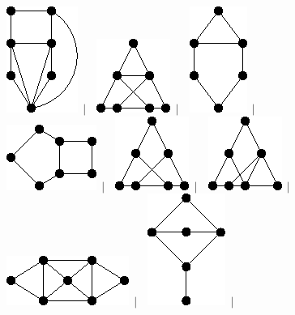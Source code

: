 \documentclass[11pt,paper=b5,footinclude,headinclude]{scrbook} %
\newtheorem{ex}{Vaja\hypertarget{sol:\theex}}[chapter]
\begin{document}
\begin{ex}
\begin{figure}
\includegraphics[scale=0.5]{smallGraphs/g_X34.png}$\,\mid\,$\
\includegraphics[scale=0.5]{smallGraphs/g_X36.png}$\,\mid\,$\
\includegraphics[scale=0.5]{smallGraphs/g_X37.png}$\,\mid\,$\
\includegraphics[scale=0.5]{smallGraphs/g_X38.png}$\,\mid\,$\
\includegraphics[scale=0.5]{smallGraphs/g_X39.png}$\,\mid\,$\
\includegraphics[scale=0.5]{smallGraphs/g_X40.png}$\,\mid\,$\
\includegraphics[scale=0.5]{smallGraphs/g_X42.png}$\,\mid\,$\
\includegraphics[scale=0.5]{smallGraphs/g_X45.png}$\,\mid\,$\

\end{figure}
\end{ex}
\end{document}
